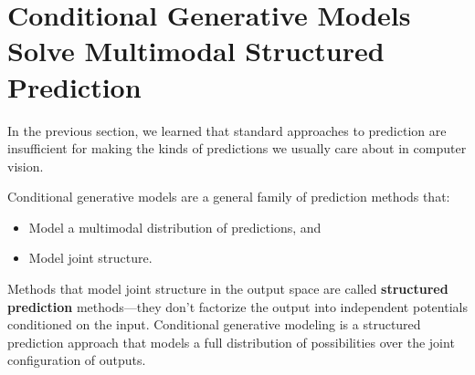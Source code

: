 

\section{Conditional Generative Models Solve Multimodal Structured Prediction}


In the previous section, we learned that standard approaches to prediction are insufficient for making the kinds of predictions we usually care about in computer vision.

Conditional generative models are a general family of prediction methods that:
\begin{itemize}
    \item Model a multimodal distribution of predictions, and 
    \item Model joint structure.
\end{itemize}

Methods that model joint structure in the output space are called \textbf{structured prediction} methods—they don't factorize the output into independent potentials conditioned on the input. Conditional generative modeling is a structured prediction approach that models a full distribution of possibilities over the joint configuration of outputs.

